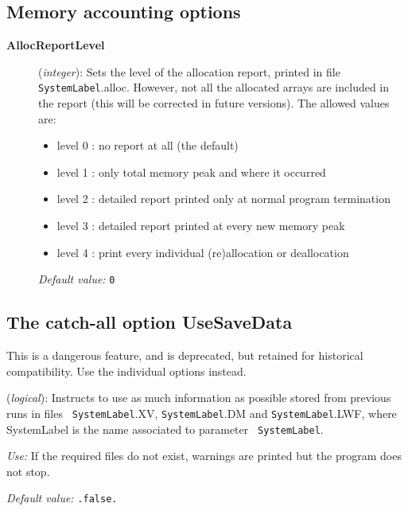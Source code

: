 \documentclass[11pt]{article}
\begin{document}
\subsection{Memory accounting options}
\begin{description}

\item[{\bf AllocReportLevel}] ({\it integer}):
Sets the level of the allocation report, printed in file
{\tt SystemLabel}.alloc. However, not all the allocated arrays are 
included in the report (this will be corrected in future versions).
The allowed values are:
\begin{itemize}
\item
  level 0 : no report at all (the default)
\item
  level 1 : only total memory peak and where it occurred
\item
  level 2 : detailed report printed only at
            normal program termination
\item
  level 3 : detailed report printed at every new memory peak
\item
  level 4 : print every individual (re)allocation or deallocation
\end{itemize}

{\it Default value:} {\tt 0}

\end{description}


\vspace{5pt}
\subsection{The catch-all option UseSaveData}

This is a dangerous feature, and is deprecated, but retained for
historical compatibility. Use the individual options instead.

\begin{description}
\itemsep 10pt
\parsep 0pt


\item[{\bf UseSaveData}] ({\it logical}):   Instructs to use as
  much information as possible stored from previous runs in files {\tt
    SystemLabel}.XV, {\tt SystemLabel}.DM and {\tt SystemLabel}.LWF,
  where SystemLabel is the name associated to parameter {\tt
    SystemLabel}.

{\it Use:} If the required files do not exist, warnings are
printed but the program does not stop.

{\it Default value:} {\tt .false.}

\end{description}
\end{document}
